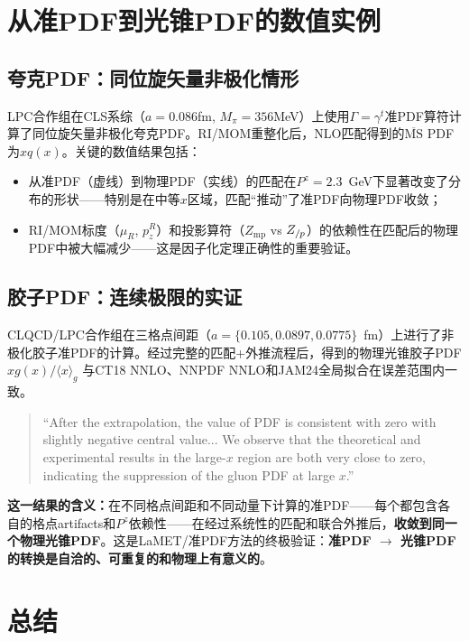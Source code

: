 \documentclass[12pt,a4paper]{ctexart}
\theoremstyle{definition}
\begin{document}
\section{从准PDF到光锥PDF的数值实例}

\subsection{夸克PDF：同位旋矢量非极化情形}

LPC合作组\cite{Liu2019isovector}在CLS系综（$a=0.086$fm, $M_\pi=356$MeV）上使用$\Gamma=\gamma^t$准PDF算符计算了同位旋矢量非极化夸克PDF。RI/MOM重整化后，NLO匹配得到的$\overline{\text{MS}}$ PDF为$xq(x)$。关键的数值结果包括：

\begin{itemize}
    \item 从准PDF（虚线）到物理PDF（实线）的匹配在$P^z=2.3$~GeV下显著改变了分布的形状——特别是在中等$x$区域，匹配``推动''了准PDF向物理PDF收敛；
    \item RI/MOM标度（$\mu_R$, $p^R_z$）和投影算符（$Z_{\text{mp}}$ vs $Z_{/\mskip-1mu p}$）的依赖性在匹配后的物理PDF中被大幅减少——这是因子化定理正确性的重要验证。
\end{itemize}

\subsection{胶子PDF：连续极限的实证}

CLQCD/LPC合作组\cite{Chen2025gluon}在三格点间距（$a=\{0.105,0.0897,0.0775\}$~fm）上进行了非极化胶子准PDF的计算。经过完整的匹配+外推流程后，得到的物理光锥胶子PDF $xg(x)/\langle x\rangle_g$ 与CT18 NNLO、NNPDF NNLO和JAM24全局拟合在误差范围内一致。

\begin{quote}
``After the extrapolation, the value of PDF is consistent with zero with slightly negative central value... We observe that the theoretical and experimental results in the large-$x$ region are both very close to zero, indicating the suppression of the gluon PDF at large $x$.''\cite{Chen2025gluon}
\end{quote}

\textbf{这一结果的含义：}在不同格点间距和不同动量下计算的准PDF——每个都包含各自的格点artifacts和$P^z$依赖性——在经过系统性的匹配和联合外推后，\textbf{收敛到同一个物理光锥PDF}。这是LaMET/准PDF方法的终极验证：\textbf{准PDF $\to$ 光锥PDF的转换是自洽的、可重复的和物理上有意义的}。

\section{总结}
\end{document}
